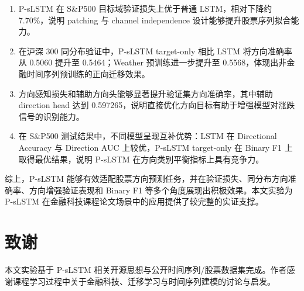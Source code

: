 \documentclass[UTF8,a4paper,twocolumn]{ctexart}
\begin{document}
\begin{enumerate}
  \item P-sLSTM 在 S\&P500 目标域验证损失上优于普通 LSTM，相对下降约 7.70\%，说明 patching 与 channel independence 设计能够提升股票序列拟合能力。
  \item 在沪深 300 同分布验证中，P-sLSTM target-only 相比 LSTM 将方向准确率从 0.5060 提升至 0.5464；Weather 预训练进一步提升至 0.5568，体现出非金融时间序列预训练的正向迁移效果。
  \item 方向感知损失和辅助方向头能够显著提升验证集方向准确率，其中辅助 direction head 达到 0.597265，说明直接优化方向目标有助于增强模型对涨跌信号的识别能力。
  \item 在 S\&P500 测试结果中，不同模型呈现互补优势：LSTM 在 Directional Accuracy 与 Direction AUC 上较优，P-sLSTM target-only 在 Binary F1 上取得最优结果，说明 P-sLSTM 在方向类别平衡指标上具有竞争力。
\end{enumerate}

综上，P-sLSTM 能够有效适配股票方向预测任务，并在验证损失、同分布方向准确率、方向增强验证表现和 Binary F1 等多个角度展现出积极效果。本文实验为 P-sLSTM 在金融科技课程论文场景中的应用提供了较完整的实证支撑。

\section*{致谢}
本文实验基于 P-sLSTM 相关开源思想与公开时间序列/股票数据集完成。作者感谢课程学习过程中关于金融科技、迁移学习与时间序列建模的讨论与启发。

\clearpage
\twocolumn
{}
{}
{


}
\end{document}
